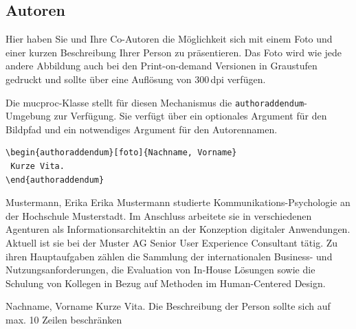 \documentclass[ngerman,forcefinal
	]{mucproc}
\newenvironment{minted}[2][]{\endgraf\verbatim}{\endverbatim}
\begin{document}
\nocite{DIN9241}

\printbibliography[prenote=bibnote]%


\subsection{Autoren}
Hier haben Sie und Ihre Co-Autoren die Möglichkeit sich mit einem Foto und einer kurzen Beschreibung Ihrer Person zu präsentieren. Das Foto wird wie jede andere Abbildung auch bei den Print-on-demand Versionen in Graustufen gedruckt und sollte über eine Auflösung von 300\,dpi verfügen.

Die \textsf{mucproc}-Klasse stellt für diesen Mechanismus die \texttt{authoraddendum}-Umgebung zur Verfügung. Sie verfügt über ein optionales Argument für den Bildpfad und ein notwendiges Argument für den Autorennamen.

\begin{verbatim}
\begin{authoraddendum}[foto]{Nachname, Vorname}
 Kurze Vita.
\end{authoraddendum}
\end{verbatim}


\begin{authoraddendum}[foto]{Mustermann, Erika}
	Erika Mustermann studierte Kommunikations-Psychologie an der Hochschule Musterstadt. Im Anschluss arbeitete sie in verschiedenen Agenturen als Informationsarchitektin an der Konzeption digitaler Anwendungen. Aktuell ist sie bei der Muster AG Senior User Experience Consultant tätig. Zu ihren Hauptaufgaben zählen die Sammlung der internationalen Business- und Nutzungsanforderungen, die Evaluation von In-House Lösungen sowie die Schulung von Kollegen in Bezug auf Methoden im Human-Centered Design.
\end{authoraddendum}

\begin{authoraddendum}[foto]{Nachname, Vorname}
	Kurze Vita. Die Beschreibung der Person sollte sich auf max. 10 Zeilen beschränken
\end{authoraddendum}
\end{document}
